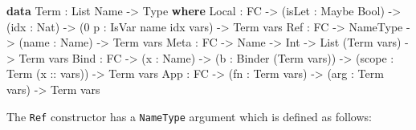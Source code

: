 \documentclass[
]{article}
\newenvironment{Shaded}{}{}
\newcommand{\DataTypeTok}[1]{\textcolor[rgb]{0.56,0.13,0.00}{#1}}
\newcommand{\DecValTok}[1]{\textcolor[rgb]{0.25,0.63,0.44}{#1}}
\newcommand{\KeywordTok}[1]{\textcolor[rgb]{0.00,0.44,0.13}{\textbf{#1}}}
\newcommand{\NormalTok}[1]{#1}
\newcommand{\OperatorTok}[1]{\textcolor[rgb]{0.40,0.40,0.40}{#1}}
\newcommand{\OtherTok}[1]{\textcolor[rgb]{0.00,0.44,0.13}{#1}}
\begin{document}
\begin{Shaded}
\begin{Highlighting}[]
\KeywordTok{data} \DataTypeTok{Term} \OperatorTok{:} \DataTypeTok{List} \DataTypeTok{Name} \OtherTok{{-}\textgreater{}} \DataTypeTok{Type} \KeywordTok{where}
     \DataTypeTok{Local} \OperatorTok{:} \DataTypeTok{FC} \OtherTok{{-}\textgreater{}}\NormalTok{ (isLet }\OperatorTok{:} \DataTypeTok{Maybe} \DataTypeTok{Bool}\NormalTok{) }\OtherTok{{-}\textgreater{}}
\NormalTok{             (idx }\OperatorTok{:} \DataTypeTok{Nat}\NormalTok{) }\OtherTok{{-}\textgreater{}}\NormalTok{ (}\DecValTok{0}\NormalTok{ p }\OperatorTok{:} \DataTypeTok{IsVar}\NormalTok{ name idx vars) }\OtherTok{{-}\textgreater{}} \DataTypeTok{Term}\NormalTok{ vars}
     \DataTypeTok{Ref} \OperatorTok{:} \DataTypeTok{FC} \OtherTok{{-}\textgreater{}} \DataTypeTok{NameType} \OtherTok{{-}\textgreater{}}\NormalTok{ (name }\OperatorTok{:} \DataTypeTok{Name}\NormalTok{) }\OtherTok{{-}\textgreater{}} \DataTypeTok{Term}\NormalTok{ vars}
     \DataTypeTok{Meta} \OperatorTok{:} \DataTypeTok{FC} \OtherTok{{-}\textgreater{}} \DataTypeTok{Name} \OtherTok{{-}\textgreater{}} \DataTypeTok{Int} \OtherTok{{-}\textgreater{}} \DataTypeTok{List}\NormalTok{ (}\DataTypeTok{Term}\NormalTok{ vars) }\OtherTok{{-}\textgreater{}} \DataTypeTok{Term}\NormalTok{ vars}
     \DataTypeTok{Bind} \OperatorTok{:} \DataTypeTok{FC} \OtherTok{{-}\textgreater{}}\NormalTok{ (x }\OperatorTok{:} \DataTypeTok{Name}\NormalTok{) }\OtherTok{{-}\textgreater{}}
\NormalTok{            (b }\OperatorTok{:} \DataTypeTok{Binder}\NormalTok{ (}\DataTypeTok{Term}\NormalTok{ vars)) }\OtherTok{{-}\textgreater{}}
\NormalTok{            (scope }\OperatorTok{:} \DataTypeTok{Term}\NormalTok{ (}\OtherTok{x ::}\NormalTok{ vars)) }\OtherTok{{-}\textgreater{}} \DataTypeTok{Term}\NormalTok{ vars}
     \DataTypeTok{App} \OperatorTok{:} \DataTypeTok{FC} \OtherTok{{-}\textgreater{}}\NormalTok{ (fn }\OperatorTok{:} \DataTypeTok{Term}\NormalTok{ vars) }\OtherTok{{-}\textgreater{}}\NormalTok{ (arg }\OperatorTok{:} \DataTypeTok{Term}\NormalTok{ vars) }\OtherTok{{-}\textgreater{}} \DataTypeTok{Term}\NormalTok{ vars}
\end{Highlighting}
\end{Shaded}

The \texttt{Ref} constructor has a \texttt{NameType} argument which is
defined as follows:
\end{document}
